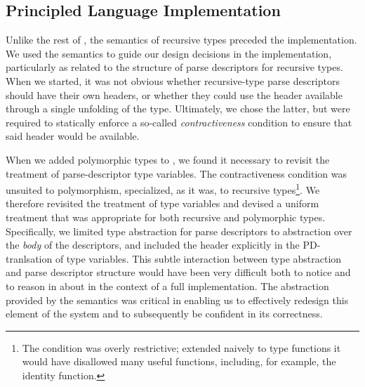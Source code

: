 
\subsection{Principled Language Implementation}

Unlike the rest of \padsc{}, the semantics of recursive types preceded
the implementation. We used the semantics to guide our design
decisions in the implementation, particularly as related to the structure of parse descriptors for recursive types. When we started, it was not obvious whether recursive-type parse descriptors should have their own headers, or whether they could use the header available through a single unfolding of the type. Ultimately, we chose the latter, but were required to statically enforce a so-called \textit{contractiveness} condition to ensure that said header would be available. 

When we added polymorphic types to \ddc{}, we found it necessary to revisit the treatment of parse-descriptor type variables. The contractiveness condition was unsuited to polymorphism, specialized, as it was, to recursive types\footnote{The condition was overly restrictive; extended naively to type functions it would have disallowed many useful functions, including, for example, the identity function.}. We therefore revisited the treatment of type variables and devised a uniform treatment that was appropriate for both recursive and polymorphic types. Specifically, we limited type abstraction for parse descriptors to abstraction over the \textit{body} of the descriptors, and included the header explicitly in the PD-tranlsation of type variables. This subtle interaction between type abstraction and parse descriptor structure would have been very difficult both to notice and to reason in about in the context of a full implementation. The abstraction provided by the semantics was critical in enabling us to effectively redesign this element of the system and to subsequently be confident in its correctness.

